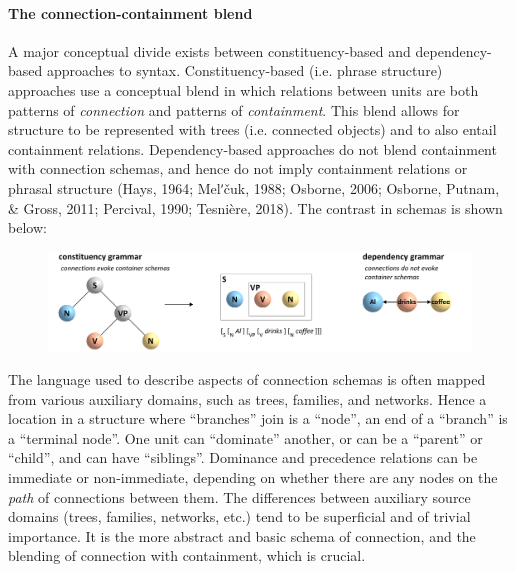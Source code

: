 \paragraph{The connection-containment blend}

A major conceptual divide exists between constituency-based and dependency-based approaches to syntax. Constituency-based (i.e. phrase structure) approaches use a conceptual blend in which relations between units are both patterns of \textit{connection} and patterns of \textit{containment}. This blend allows for structure to be represented with trees (i.e. connected objects) and to also entail containment relations. Dependency-based approaches do not blend containment with connection schemas, and hence do not imply containment relations or phrasal structure (Hays, 1964; Melʹčuk, 1988; Osborne, 2006; Osborne, Putnam, \& Gross, 2011; Percival, 1990; Tesnière, 2018). The contrast in schemas is shown below: 

  
\begin{figure}
\includegraphics[width=\textwidth]{figures/Tilsen-img34.png}
\caption{\missingcaption}
\label{fig:}
\end{figure}
 

  The language used to describe aspects of connection schemas is often mapped from various auxiliary domains, such as trees, families, and networks. Hence a location in a structure where “branches” join is a “node”, an end of a “branch” is a “terminal node”. One unit can “dominate” another, or can be a “parent” or “child”, and can have “siblings”. Dominance and precedence relations can be immediate or non-immediate, depending on whether there are any nodes on the \textit{path} of connections between them. The differences between auxiliary source domains (trees, families, networks, etc.) tend to be superficial and of trivial importance. It is the more abstract and basic schema of connection, and the blending of connection with containment, which is crucial.   

